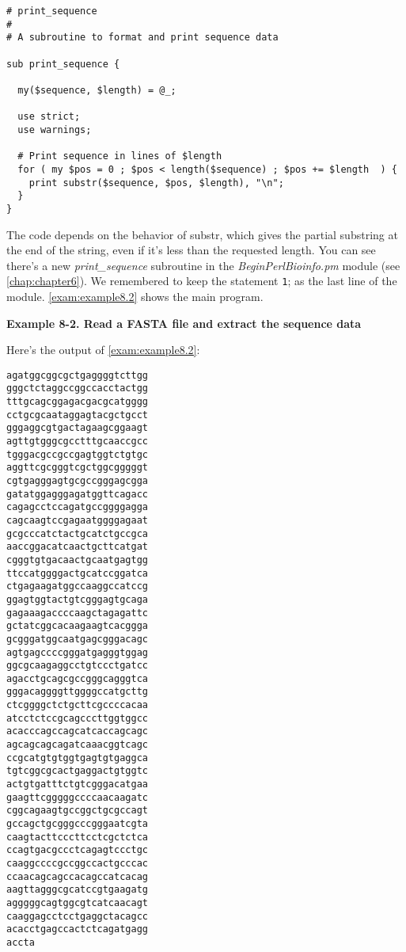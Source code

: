\begin{lstlisting}
# print_sequence
#
# A subroutine to format and print sequence data 

sub print_sequence {
  
  my($sequence, $length) = @_;

  use strict;
  use warnings;

  # Print sequence in lines of $length
  for ( my $pos = 0 ; $pos < length($sequence) ; $pos += $length  ) {
    print substr($sequence, $pos, $length), "\n";
  }
}
\end{lstlisting}

The code depends on the behavior of substr, which gives the partial substring at the end of the string, even if it's less than the requested length. You can see there's a new \textit{print\_sequence} subroutine in the \textit{BeginPerlBioinfo.pm} module (see \autoref{chap:chapter6}). We remembered to keep the statement \verb|1|; as the last line of the module. \autoref{exam:example8.2} shows the main program. 

\textbf{Example 8-2. Read a FASTA file and extract the sequence data}


Here's the output of \autoref{exam:example8.2}:

\begin{lstlisting}
agatggcggcgctgaggggtcttgg
gggctctaggccggccacctactgg
tttgcagcggagacgacgcatgggg
cctgcgcaataggagtacgctgcct
gggaggcgtgactagaagcggaagt
agttgtgggcgcctttgcaaccgcc
tgggacgccgccgagtggtctgtgc
aggttcgcgggtcgctggcgggggt
cgtgagggagtgcgccgggagcgga
gatatggagggagatggttcagacc
cagagcctccagatgccggggagga
cagcaagtccgagaatggggagaat
gcgcccatctactgcatctgccgca
aaccggacatcaactgcttcatgat
cgggtgtgacaactgcaatgagtgg
ttccatggggactgcatccggatca
ctgagaagatggccaaggccatccg
ggagtggtactgtcgggagtgcaga
gagaaagaccccaagctagagattc
gctatcggcacaagaagtcacggga
gcgggatggcaatgagcgggacagc
agtgagccccgggatgagggtggag
ggcgcaagaggcctgtccctgatcc
agacctgcagcgccgggcagggtca
gggacaggggttggggccatgcttg
ctcggggctctgcttcgccccacaa
atcctctccgcagcccttggtggcc
acacccagccagcatcaccagcagc
agcagcagcagatcaaacggtcagc
ccgcatgtgtggtgagtgtgaggca
tgtcggcgcactgaggactgtggtc
actgtgatttctgtcgggacatgaa
gaagttcgggggccccaacaagatc
cggcagaagtgccggctgcgccagt
gccagctgcgggcccgggaatcgta
caagtacttcccttcctcgctctca
ccagtgacgccctcagagtccctgc
caaggccccgccggccactgcccac
ccaacagcagccacagccatcacag
aagttagggcgcatccgtgaagatg
agggggcagtggcgtcatcaacagt
caaggagcctcctgaggctacagcc
acacctgagccactctcagatgagg
accta
\end{lstlisting}

